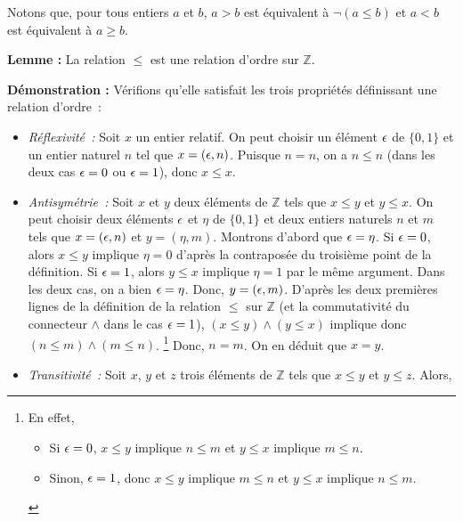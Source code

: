 \medskip

Notons que, pour tous entiers $a$ et $b$, $a > b$ est équivalent à $\neg (a \leq b)$ et $a < b$ est équivalent à $a \geq b$.

\medskip

\noindent\textbf{Lemme :} La relation $\leq$ est une relation d'ordre sur $\mathbb{Z}$.

\medskip

\noindent\textbf{Démonstration :} Vérifions qu'elle satisfait les trois propriétés définissant une relation d'ordre : 
\begin{itemize}[nosep]
    \item \textit{Réflexivité :} Soit $x$ un entier relatif. 
        On peut choisir un élément $\epsilon$ de $\lbrace 0, 1 \rbrace$ et un entier naturel $n$ tel que $x = (\epsilon, n)$. 
        Puisque $n = n$, on a $n \leq n$ (dans les deux cas $\epsilon = 0$ ou $\epsilon = 1$), donc $x \leq x$.
    \item \textit{Antisymétrie :} Soit $x$ et $y$ deux éléments de $\mathbb{Z}$ tels que $x \leq y$ et $y \leq x$.
        On peut choisir deux éléments $\epsilon$ et $\eta$ de $\lbrace 0, 1 \rbrace$ et deux entiers naturels $n$ et $m$ tels que $x = (\epsilon, n)$ et $y = (\eta, m)$. 
        Montrons d'abord que $\epsilon = \eta$. 
        Si $\epsilon = 0$, alors $x \leq y$ implique $\eta = 0$ d'après la contraposée du troisième point de la définition.
        Si $\epsilon = 1$, alors $y \leq x$ implique $\eta = 1$ par le même argument. 
        Dans les deux cas, on a bien $\epsilon = \eta$. 
        Donc, $y = (\epsilon, m)$. 
        D'après les deux premières lignes de la définition de la relation $\leq$ sur $\mathbb{Z}$ (et la commutativité du connecteur $\wedge$ dans le cas $\epsilon = 1$), $(x \leq y) \wedge (y \leq x)$ implique donc $(n \leq m) \wedge (m \leq n)$.%
        \footnote{
            En effet, 
            \begin{itemize}[nosep]
                \item Si $\epsilon = 0$, $x \leq y$ implique $n \leq m$ et $y \leq x$ implique $m \leq n$.
                \item Sinon, $\epsilon = 1$, donc $x \leq y$ implique $m \leq n$ et $y \leq x$ implique $n \leq m$.
            \end{itemize}
        }
        Donc, $n = m$. 
        On en déduit que $x = y$.
    \item \textit{Transitivité :} Soit $x$, $y$ et $z$ trois éléments de $\mathbb{Z}$ tels que $x \leq y$ et $y \leq z$. 
        Alors, 
        \begin{itemize}[nosep]

\end{itemize}
\end{itemize}
